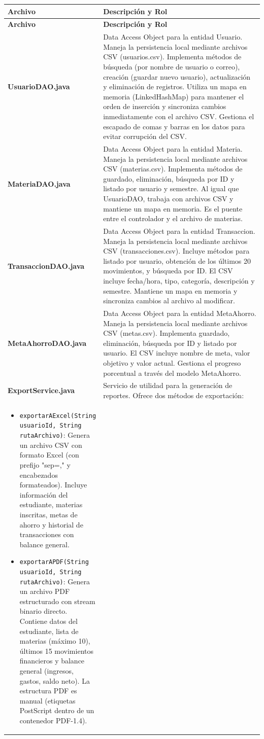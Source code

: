 \documentclass[utf8]{article}
\begin{document}
\begin{longtable}{p{0.15\linewidth}p{0.85\linewidth}}
\hline
\textbf{Archivo} & \textbf{Descripción y Rol} \\ \hline
\endfirsthead
\hline
\textbf{Archivo} & \textbf{Descripción y Rol} \\ \hline
\endhead
\hline
\endfoot
\hline
\endlastfoot
\textbf{UsuarioDAO.java} & Data Access Object para la entidad Usuario. Maneja la persistencia local mediante archivos CSV (usuarios.csv). Implementa métodos de búsqueda (por nombre de usuario o correo), creación (guardar nuevo usuario), actualización y eliminación de registros. Utiliza un mapa en memoria (LinkedHashMap) para mantener el orden de inserción y sincroniza cambios inmediatamente con el archivo CSV. Gestiona el escapado de comas y barras en los datos para evitar corrupción del CSV. \\ \hline
\textbf{MateriaDAO.java} & Data Access Object para la entidad Materia. Maneja la persistencia local mediante archivos CSV (materias.csv). Implementa métodos de guardado, eliminación, búsqueda por ID y listado por usuario y semestre. Al igual que UsuarioDAO, trabaja con archivos CSV y mantiene un mapa en memoria. Es el puente entre el controlador y el archivo de materias. \\ \hline
\textbf{TransaccionDAO.java} & Data Access Object para la entidad Transaccion. Maneja la persistencia local mediante archivos CSV (transacciones.csv). Incluye métodos para listado por usuario, obtención de los últimos 20 movimientos, y búsqueda por ID. El CSV incluye fecha/hora, tipo, categoría, descripción y semestre. Mantiene un mapa en memoria y sincroniza cambios al archivo al modificar. \\ \hline
\textbf{MetaAhorroDAO.java} & Data Access Object para la entidad MetaAhorro. Maneja la persistencia local mediante archivos CSV (metas.csv). Implementa guardado, eliminación, búsqueda por ID y listado por usuario. El CSV incluye nombre de meta, valor objetivo y valor actual. Gestiona el progreso porcentual a través del modelo MetaAhorro. \\ \hline
\textbf{ExportService.java} & Servicio de utilidad para la generación de reportes. Ofrece dos métodos de exportación:\\
\begin{itemize}[leftmargin=*, topsep=0pt, itemsep=0.5em]
    \item \texttt{exportarAExcel(String usuarioId, String rutaArchivo)}: Genera un archivo CSV con formato Excel (con prefijo "sep=," y encabezados formateados). Incluye información del estudiante, materias inscritas, metas de ahorro y historial de transacciones con balance general.
    \item \texttt{exportarAPDF(String usuarioId, String rutaArchivo)}: Genera un archivo PDF estructurado con stream binario directo. Contiene datos del estudiante, lista de materias (máximo 10), últimos 15 movimientos financieros y balance general (ingresos, gastos, saldo neto). La estructura PDF es manual (etiquetas PostScript dentro de un contenedor PDF-1.4).
\end{itemize} \\ \hline
\end{longtable}
\end{document}
